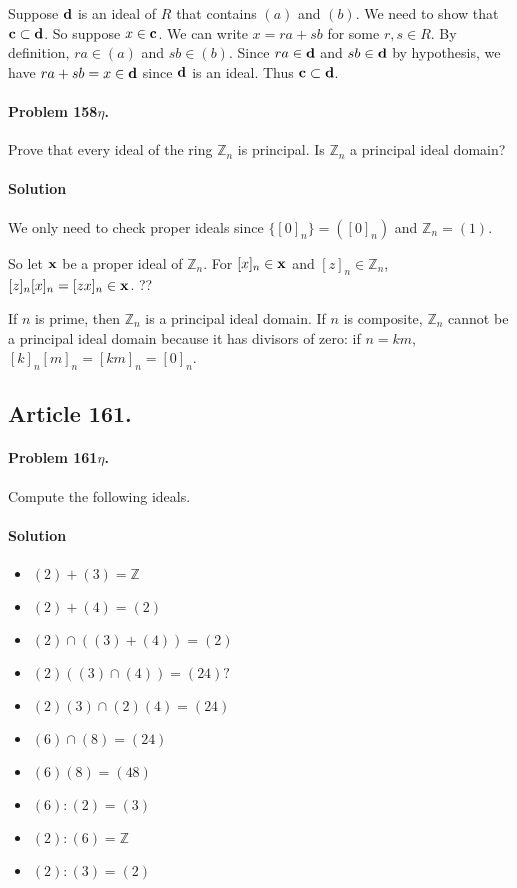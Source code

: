 Suppose $\mathsf{\mathbf{d}}$ is an ideal of $R$ that contains $(a)$ and $(b)$. We need to
show that $ \mathsf{\mathbf{c}} \subset \mathsf{\mathbf{d}}$. So suppose $ x \in \mathsf{\mathbf{c}}$. We can
write $x = ra + sb $ for some $r, s \in R$. By definition, $ ra \in (a) $ and $
sb \in (b) $. Since $ra \in \mathsf{\mathbf{d}}$ and $sb \in \mathsf{\mathbf{d}}$ by hypothesis, we
have $ra + sb = x \in \mathsf{\mathbf{d}}$ since $\mathsf{\mathbf{d}}$ is an ideal.  Thus $ \mathsf{\mathbf{c}}
\subset \mathsf{\mathbf{d}} $.

\paragraph{Problem 158$\eta$.}
Prove that every ideal of the ring $\mathbb{Z}_n$ is principal. Is
$\mathbb{Z}_n$ a principal ideal domain?

\paragraph*{Solution}
We only need to check proper ideals since $\{[0]_n\} = ([0]_n)$ and $\mathbb{Z}_n = (1)$.

So let $\mathsf{\mathbf{x}}$ be a proper ideal of $\mathbb{Z}_n$. For $ [x]_n \in \mathsf{\mathbf{x}}$ and
$ [z]_n \in \mathbb{Z}_n $, $ [z]_n [x]_n = [zx]_n \in \mathsf{\mathbf{x}}$. ??

If $n$ is prime, then $\mathbb{Z}_n$ is a principal ideal domain.  If $n$ is
composite, $\mathbb{Z}_n$ cannot be a principal ideal domain because it has
divisors of zero: if $n = km$, $[k]_n [m]_n = [km]_n = [0]_n$.

\subsection{Article 161.}

\paragraph{Problem 161$\eta$.}
Compute the following ideals.

\paragraph*{Solution}
\begin{itemize}
\item $(2) + (3) = \mathbb{Z}$
\item $(2) + (4) = (2)$
\item $(2) \cap ((3) + (4)) = (2)$
\item $(2)((3) \cap (4)) = (24) ?$
\item $(2)(3) \cap (2)(4) = (24)$
\item $(6) \cap (8) = (24)$
\item $(6)(8) = (48)$
\item $(6) : (2) = (3)$
\item $(2) : (6) = \mathbb{Z}$
\item $(2) : (3) = (2)$
\end{itemize}

